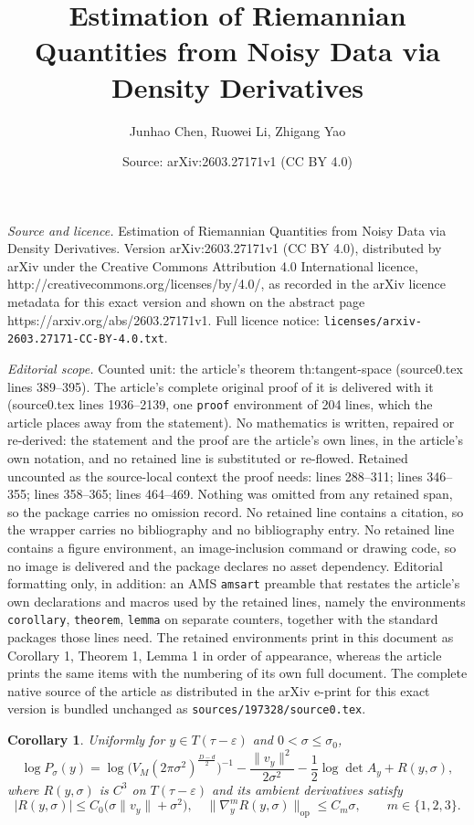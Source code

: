 \documentclass[10pt,a4paper]{amsart}
\title{Estimation of Riemannian Quantities from Noisy Data via Density Derivatives}
\author{Junhao Chen, Ruowei Li, Zhigang Yao}
\date{Source: arXiv:2603.27171v1 (CC BY 4.0)}
\newtheorem{corollary}{Corollary}
\begin{document}
\maketitle

\noindent\emph{Source and licence.} Estimation of Riemannian Quantities from Noisy Data via Density Derivatives. Version arXiv:2603.27171v1 (CC BY 4.0), distributed by arXiv under the Creative Commons Attribution 4.0 International licence, http://creativecommons.org/licenses/by/4.0/, as recorded in the arXiv licence metadata for this exact version and shown on the abstract page https://arxiv.org/abs/2603.27171v1. Full licence notice: \texttt{licenses/arxiv-2603.27171-CC-BY-4.0.txt}.\par\smallskip

\noindent\textit{Editorial scope.} Counted unit: the article's theorem th:tangent-space (source0.tex lines 389--395). The article's complete original proof of it is delivered with it (source0.tex lines 1936--2139, one \texttt{proof} environment of 204 lines, which the article places away from the statement). No mathematics is written, repaired or re-derived: the statement and the proof are the article's own lines, in the article's own notation, and no retained line is substituted or re-flowed.  Retained uncounted as the source-local context the proof needs: lines 288--311; lines 346--355; lines 358--365; lines 464--469.  Nothing was omitted from any retained span, so the package carries no omission record.  No retained line contains a citation, so the wrapper carries no bibliography and no bibliography entry.  No retained line contains a figure environment, an image-inclusion command or drawing code, so no image is delivered and the package declares no asset dependency.  Editorial formatting only, in addition: an AMS \texttt{amsart} preamble that restates the article's own declarations and macros used by the retained lines, namely the environments \texttt{corollary}, \texttt{theorem}, \texttt{lemma} on separate counters, together with the standard packages those lines need.  The retained environments print in this document as Corollary 1, Theorem 1, Lemma 1 in order of appearance, whereas the article prints the same items with the numbering of its own full document.  The complete native source of the article as distributed in the arXiv e-print for this exact version is bundled unchanged as \texttt{sources/197328/source0.tex}.
\begin{corollary}\label{co:log-density}
Uniformly for $y\in T(\tau-\varepsilon)$ and $0<\sigma\le\sigma_0$,
\begin{equation}\label{eq:log density}
\log P_\sigma(y)
=
\log \big(V_M(2\pi\sigma^2)^{\frac{D-d}{2}}\big)^{-1}
-
\frac{\|v_y\|^2}{2\sigma^2}
-
\frac{1}{2}\log\det A_y
+
R(y,\sigma),
\end{equation}
where $R(y,\sigma)$ is $C^3$ on $T(\tau-\varepsilon)$ and its ambient derivatives satisfy
\[
|R(y,\sigma)| \le C_{0}\big(\sigma\|v_y\|+\sigma^2\big),
\quad
\|\nabla_y^m R(y,\sigma)\|_{\mathrm{op}}
\le
C_{m}\sigma,
\qquad
m\in\{1,2,3\}.
\]
\end{corollary}
\end{document}
